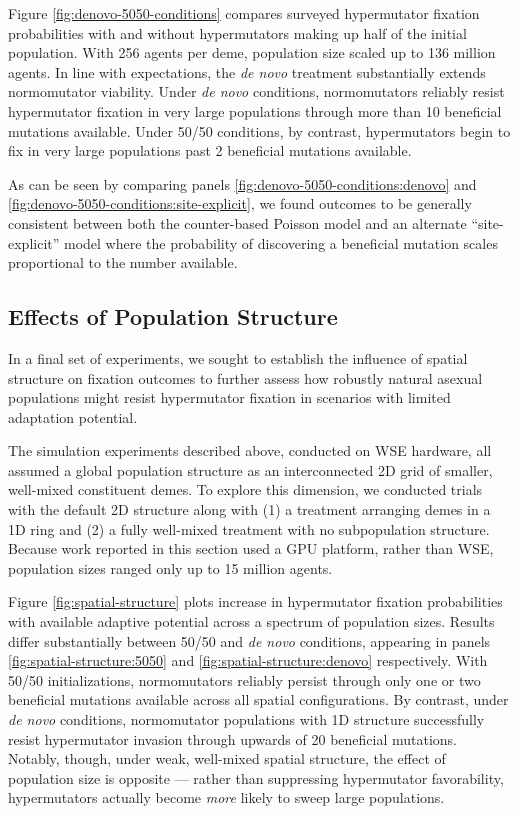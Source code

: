 Figure \ref{fig:denovo-5050-conditions} compares surveyed hypermutator fixation probabilities with and without hypermutators making up half of the initial population.
With 256 agents per deme, population size scaled up to 136 million agents.
In line with expectations, the \textit{de novo} treatment substantially extends normomutator viability.
Under \textit{de novo} conditions, normomutators reliably resist hypermutator fixation in very large populations through more than 10 beneficial mutations available.
Under 50/50 conditions, by contrast, hypermutators begin to fix in very large populations past 2 beneficial mutations available.

As can be seen by comparing panels \ref{fig:denovo-5050-conditions:denovo} and \ref{fig:denovo-5050-conditions:site-explicit}, we found outcomes to be generally consistent between both the counter-based Poisson model and an alternate ``site-explicit'' model where the probability of discovering a beneficial mutation scales proportional to the number available.

\subsection{Effects of Population Structure}
\label{sec:population-structure}

In a final set of experiments, we sought to establish the influence of spatial structure on fixation outcomes to further assess how robustly natural asexual populations might resist hypermutator fixation in scenarios with limited adaptation potential.

The simulation experiments described above, conducted on WSE hardware, all assumed a global population structure as an interconnected 2D grid of smaller, well-mixed constituent demes.
To explore this dimension, we conducted trials with the default 2D structure along with (1) a treatment arranging demes in a 1D ring and (2) a fully well-mixed treatment with no subpopulation structure.
Because work reported in this section used a GPU platform, rather than WSE, population sizes ranged only up to 15 million agents.



Figure \ref{fig:spatial-structure} plots increase in hypermutator fixation probabilities with available adaptive potential across a spectrum of population sizes.
Results differ substantially between 50/50 and \textit{de novo} conditions, appearing in panels \ref{fig:spatial-structure:5050} and \ref{fig:spatial-structure:denovo} respectively.
With 50/50 initializations, normomutators reliably persist through only one or two beneficial mutations available across all spatial configurations.
By contrast, under \textit{de novo} conditions, normomutator populations with 1D structure successfully resist hypermutator invasion through upwards of 20 beneficial mutations.
Notably, though, under weak, well-mixed spatial structure, the effect of population size is opposite --- rather than suppressing hypermutator favorability, hypermutators actually become \textit{more} likely to sweep large populations.

